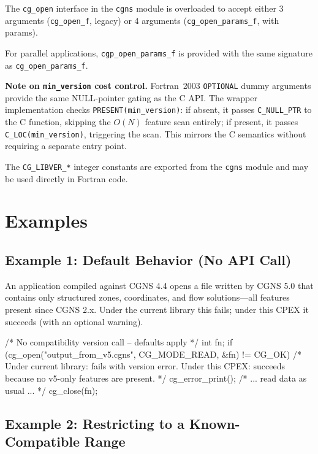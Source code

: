 \documentclass[11pt,letterpaper]{article}
\makeatletter
\let\cgns@orig@lstlisting\lstlisting
\let\cgns@endorig@lstlisting\endlstlisting
\renewenvironment{lstlisting}
  {\par\needspace{5\baselineskip}\nolinenumbers\cgns@orig@lstlisting}
  {\cgns@endorig@lstlisting\par\linenumbers}
\makeatother
\begin{document}
The \texttt{cg\_open} interface in the \texttt{cgns} module is
overloaded to accept either 3 arguments (\texttt{cg\_open\_f}, legacy)
or 4 arguments (\texttt{cg\_open\_params\_f}, with params).

For parallel applications, \texttt{cgp\_open\_params\_f} is provided
with the same signature as \texttt{cg\_open\_params\_f}.

\textbf{Note on \texttt{min\_version} cost control.}
Fortran~2003 \texttt{OPTIONAL} dummy arguments provide the same
NULL-pointer gating as the C API.  The wrapper implementation checks
\texttt{PRESENT(min\_version)}: if absent, it passes
\texttt{C\_NULL\_PTR} to the C function, skipping the $O(N)$ feature
scan entirely; if present, it passes \texttt{C\_LOC(min\_version)},
triggering the scan.  This mirrors the C semantics without requiring
a separate entry point.

The \texttt{CG\_LIBVER\_*} integer constants are exported from the
\texttt{cgns} module and may be used directly in Fortran code.

\section{Examples}

\subsection{Example 1: Default Behavior (No API Call)}

An application compiled against CGNS 4.4 opens a file written by
CGNS 5.0 that contains only structured zones, coordinates, and
flow solutions---all features present since CGNS 2.x.  Under the
current library this fails; under this CPEX it succeeds (with an
optional warning).

\begin{lstlisting}[language=C]
/* No compatibility version call -- defaults apply */
int fn;
if (cg_open("output_from_v5.cgns", CG_MODE_READ, &fn)
        != CG_OK) {
    /* Under current library: fails with version error.
       Under this CPEX: succeeds because no v5-only
       features are present. */
    cg_error_print();
}
/* ... read data as usual ... */
cg_close(fn);
\end{lstlisting}

\subsection{Example 2: Restricting to a Known-Compatible Range}
\end{document}
